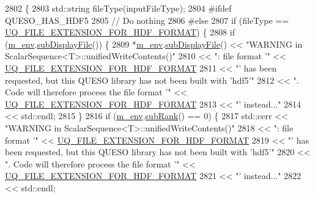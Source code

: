 \begin{DoxyCode}
2802 \{
2803   std::string fileType(inputFileType);
2804 \textcolor{preprocessor}{#ifdef QUESO\_HAS\_HDF5}
2805 \textcolor{preprocessor}{}  \textcolor{comment}{// Do nothing}
2806 \textcolor{preprocessor}{#else}
2807 \textcolor{preprocessor}{}  \textcolor{keywordflow}{if} (fileType == \hyperlink{_defines_8h_a4ebcc075277d031eb97c90b9a45f4493}{UQ\_FILE\_EXTENSION\_FOR\_HDF\_FORMAT}) \{
2808     \textcolor{keywordflow}{if} (\hyperlink{class_q_u_e_s_o_1_1_scalar_sequence_a71618cd6351b29361b437af68447a4c8}{m\_env}.\hyperlink{class_q_u_e_s_o_1_1_base_environment_a8a0064746ae8dddfece4229b9ad374d6}{subDisplayFile}()) \{
2809       *\hyperlink{class_q_u_e_s_o_1_1_scalar_sequence_a71618cd6351b29361b437af68447a4c8}{m\_env}.\hyperlink{class_q_u_e_s_o_1_1_base_environment_a8a0064746ae8dddfece4229b9ad374d6}{subDisplayFile}() << \textcolor{stringliteral}{"WARNING in ScalarSequence<T>::unifiedWriteContents()"}
2810                               << \textcolor{stringliteral}{": file format '"} << 
      \hyperlink{_defines_8h_a4ebcc075277d031eb97c90b9a45f4493}{UQ\_FILE\_EXTENSION\_FOR\_HDF\_FORMAT}
2811                               << \textcolor{stringliteral}{"' has been requested, but this QUESO library has not been built with
       'hdf5'"}
2812                               << \textcolor{stringliteral}{". Code will therefore process the file format '"} << 
      \hyperlink{_defines_8h_a4ebcc075277d031eb97c90b9a45f4493}{UQ\_FILE\_EXTENSION\_FOR\_HDF\_FORMAT}
2813                               << \textcolor{stringliteral}{"' instead..."}
2814                               << std::endl;
2815     \}
2816     \textcolor{keywordflow}{if} (\hyperlink{class_q_u_e_s_o_1_1_scalar_sequence_a71618cd6351b29361b437af68447a4c8}{m\_env}.\hyperlink{class_q_u_e_s_o_1_1_base_environment_a172d52f993f1322ed45aaddf71518dbb}{subRank}() == 0) \{
2817       std::cerr << \textcolor{stringliteral}{"WARNING in ScalarSequence<T>::unifiedWriteContents()"}
2818                 << \textcolor{stringliteral}{": file format '"} << \hyperlink{_defines_8h_a4ebcc075277d031eb97c90b9a45f4493}{UQ\_FILE\_EXTENSION\_FOR\_HDF\_FORMAT}
2819                 << \textcolor{stringliteral}{"' has been requested, but this QUESO library has not been built with 'hdf5'"}
2820                 << \textcolor{stringliteral}{". Code will therefore process the file format '"} << 
      \hyperlink{_defines_8h_a4ebcc075277d031eb97c90b9a45f4493}{UQ\_FILE\_EXTENSION\_FOR\_HDF\_FORMAT}
2821                 << \textcolor{stringliteral}{"' instead..."}
2822                 << std::endl;

\end{DoxyCode}
